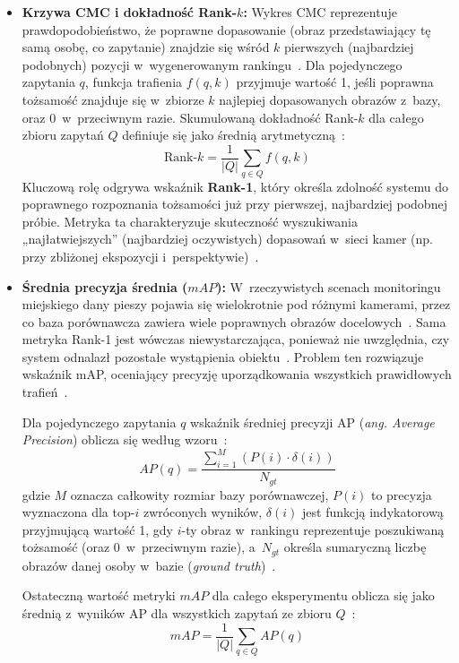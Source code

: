\begin{itemize}
  \item \textbf{Krzywa CMC i dokładność Rank-$k$:} Wykres CMC reprezentuje prawdopodobieństwo, że poprawne dopasowanie (obraz przedstawiający tę samą osobę, co zapytanie) znajdzie się wśród $k$ pierwszych (najbardziej podobnych) pozycji w~wygenerowanym rankingu~\cite{ge2020mutual, zheng2017wild}. Dla pojedynczego zapytania $q$, funkcja trafienia $f(q, k)$ przyjmuje wartość 1, jeśli poprawna tożsamość znajduje się w~zbiorze $k$ najlepiej dopasowanych obrazów z~bazy, oraz 0~w~przeciwnym razie. Skumulowaną dokładność Rank-$k$ dla całego zbioru zapytań $Q$ definiuje się jako średnią arytmetyczną~\cite{zheng2017wild}:
        \begin{equation}
          \text{Rank-}k = \frac{1}{|Q|} \sum_{q \in Q} f(q, k)
        \end{equation}
        Kluczową rolę odgrywa wskaźnik \textbf{Rank-1}, który określa zdolność systemu do poprawnego rozpoznania tożsamości już przy pierwszej, najbardziej podobnej próbie. Metryka ta charakteryzuje skuteczność wyszukiwania „najłatwiejszych” (najbardziej oczywistych) dopasowań w~sieci kamer (np. przy zbliżonej ekspozycji i~perspektywie)~\cite{sun2018beyond}.

  \item \textbf{Średnia precyzja średnia ($mAP$):} W~rzeczywistych scenach monitoringu miejskiego dany pieszy pojawia się wielokrotnie pod różnymi kamerami, przez co baza porównawcza zawiera wiele poprawnych obrazów docelowych~\cite{zheng2017wild}. Sama metryka Rank-1 jest wówczas niewystarczająca, ponieważ nie uwzględnia, czy system odnalazł pozostałe wystąpienia obiektu~\cite{sun2018beyond}. Problem ten rozwiązuje wskaźnik mAP, oceniający precyzję uporządkowania wszystkich prawidłowych trafień~\cite{zheng2017wild}.

        Dla pojedynczego zapytania $q$ wskaźnik średniej precyzji AP (\textit{ang. Average Precision})
        oblicza się według wzoru~\cite{zheng2017wild}:
        \begin{equation}
          AP(q) = \frac{\sum_{i=1}^{M} \left( P(i) \cdot \delta(i) \right)}{N_{gt}}
        \end{equation}
        gdzie $M$ oznacza całkowity rozmiar bazy porównawczej, $P(i)$ to precyzja wyznaczona dla top-$i$ zwróconych wyników, $\delta(i)$ jest funkcją indykatorową przyjmującą wartość 1, gdy $i$-ty obraz w~rankingu reprezentuje poszukiwaną tożsamość (oraz 0~w~przeciwnym razie), a~$N_{gt}$ określa sumaryczną liczbę obrazów danej osoby w~bazie (\textit{ground truth})~\cite{zheng2017wild}.

        Ostateczną wartość metryki $mAP$ dla całego eksperymentu oblicza się jako średnią z~wyników AP dla
        wszystkich zapytań ze zbioru $Q$~\cite{zheng2017wild}:
        \begin{equation}
          mAP = \frac{1}{|Q|} \sum_{q \in Q} AP(q)
        \end{equation}
\end{itemize}

